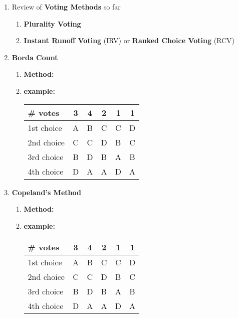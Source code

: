 \documentclass[12pt]{article}
\renewcommand{\emph}[1]{\textsf{\textbf{#1}}}
\begin{document}
\begin{enumerate}
\item Review of \emph{Voting Methods} so far\\
	\begin{enumerate}
	\item \emph{Plurality Voting}
	\vspace{1in}
	\item \emph{Instant Runoff Voting} (IRV) or \emph{Ranked Choice Voting} (RCV)
	\vfill
	\end{enumerate}
\item \emph{Borda Count}
	\begin{enumerate}
	\item \emph{Method:}
	\vspace{1.5in}
	\item \emph{example:}
	
	\begin{tabular}{l || c |c|c|c|c}
\# votes&3&4&2&1&1\\
\hline
1st choice&A&B&C&C&D\\
2nd choice&C&C&D&B&C\\
3rd choice&B&D&B&A&B\\
4th choice&D&A&A&D&A\\
\end{tabular}
	\vfill
	\end{enumerate}
\newpage
\item \emph{Copeland's Method}
	\begin{enumerate}
	\item \emph{Method:}
	\vspace{1.5in}
	\item \emph{example:}
	
	\begin{tabular}{l || c |c|c|c|c}
\# votes&3&4&2&1&1\\
\hline
1st choice&A&B&C&C&D\\
2nd choice&C&C&D&B&C\\
3rd choice&B&D&B&A&B\\
4th choice&D&A&A&D&A\\
\end{tabular}
	\vfill
	
	\end{enumerate}

\end{enumerate}
\end{document}
